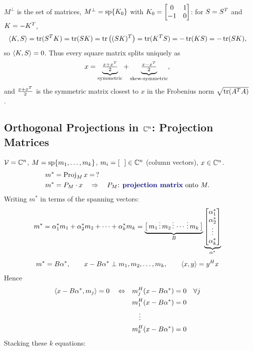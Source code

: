 \begin{example}
\begin{align*}
\end{align*}
\begin{insight}
$M^\perp$ is the set of  matrices, $M^\perp = \operatorname{sp}\{K_0\}$ with $K_0 = \begin{bmatrix}0&1\\-1&0\end{bmatrix}$:
for $S=S^{T}$ and $K=-K^{T}$,
\[
\left\langle K, S \right\rangle = \operatorname{tr}(S^{T} K) = \operatorname{tr}(SK) = \operatorname{tr}\big((SK)^{T}\big) = \operatorname{tr}(K^{T} S) = -\operatorname{tr}(KS) = -\operatorname{tr}(SK),
\]
so $\left\langle K, S \right\rangle=0$. Thus every square matrix splits uniquely as
\[
x = \underbrace{\tfrac{x+x^{T}}{2}}_{\text{symmetric}} + \underbrace{\tfrac{x-x^{T}}{2}}_{\text{skew-symmetric}},
\]
and $\tfrac{x+x^{T}}{2}$ is the symmetric matrix closest to $x$ in the Frobenius norm $\sqrt{\operatorname{tr}(A^{T} A)}$.
\end{insight}
\end{example}

\subsection{Orthogonal Projections in $\mathbb{C}^n$: Projection Matrices}\label{ss:proj-matrices}
$\mathcal{V}=\mathbb{C}^n$, \quad $M = \operatorname{sp}\{m_1,\dots,m_k\}$, \quad $m_i = [\ \ ] \in\mathbb{C}^n$ (column vectors), \quad $x\in\mathbb{C}^n$.
\begin{align*}
m^* &= \operatorname{Proj}_M x = \,?\\
m^* &= P_M\cdot x \quad\Rightarrow\quad P_M\text{: \term{projection matrix} onto } M.
\end{align*}
Writing $m^*$ in terms of the spanning vectors:
\begin{gather*}
m^* = \alpha_1^* m_1 + \alpha_2^* m_2 + \dots + \alpha_k^* m_k
= \underbrace{\big[\, m_1 \,\vdots\, m_2 \,\vdots\, \cdots \,\vdots\, m_k\,\big]}_{B}
\underbrace{\begin{bmatrix}\alpha_1^*\\ \alpha_2^*\\ \vdots\\ \alpha_k^*\end{bmatrix}}_{\alpha^*}\\[4pt]
m^* = B\alpha^*, \qquad x-B\alpha^* \perp m_1, m_2, \dots, m_k, \qquad \left\langle x, y \right\rangle = y^{H} x
\end{gather*}
Hence
\begin{align*}
\left\langle x-B\alpha^*, m_j \right\rangle = 0 \quad\Leftrightarrow\quad & m_j^{H}(x-B\alpha^*) = 0 \quad\forall j\\
& m_1^{H}(x-B\alpha^*) = 0\\
& \quad\vdots\\
& m_k^{H}(x-B\alpha^*) = 0
\end{align*}
Stacking these $k$ equations:
